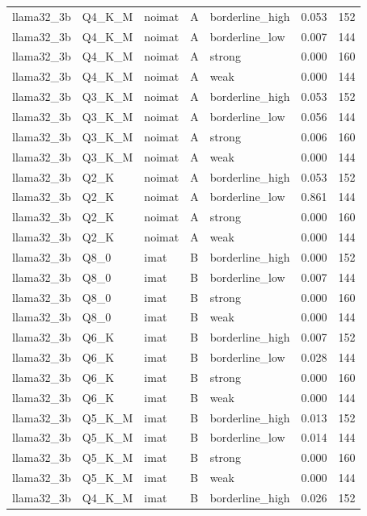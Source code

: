 \begin{tabular}{lllllrr}
llama32\_3b & Q4\_K\_M & noimat & A & borderline\_high & 0.053 & 152 \\
llama32\_3b & Q4\_K\_M & noimat & A & borderline\_low & 0.007 & 144 \\
llama32\_3b & Q4\_K\_M & noimat & A & strong & 0.000 & 160 \\
llama32\_3b & Q4\_K\_M & noimat & A & weak & 0.000 & 144 \\
llama32\_3b & Q3\_K\_M & noimat & A & borderline\_high & 0.053 & 152 \\
llama32\_3b & Q3\_K\_M & noimat & A & borderline\_low & 0.056 & 144 \\
llama32\_3b & Q3\_K\_M & noimat & A & strong & 0.006 & 160 \\
llama32\_3b & Q3\_K\_M & noimat & A & weak & 0.000 & 144 \\
llama32\_3b & Q2\_K & noimat & A & borderline\_high & 0.053 & 152 \\
llama32\_3b & Q2\_K & noimat & A & borderline\_low & 0.861 & 144 \\
llama32\_3b & Q2\_K & noimat & A & strong & 0.000 & 160 \\
llama32\_3b & Q2\_K & noimat & A & weak & 0.000 & 144 \\
llama32\_3b & Q8\_0 & imat & B & borderline\_high & 0.000 & 152 \\
llama32\_3b & Q8\_0 & imat & B & borderline\_low & 0.007 & 144 \\
llama32\_3b & Q8\_0 & imat & B & strong & 0.000 & 160 \\
llama32\_3b & Q8\_0 & imat & B & weak & 0.000 & 144 \\
llama32\_3b & Q6\_K & imat & B & borderline\_high & 0.007 & 152 \\
llama32\_3b & Q6\_K & imat & B & borderline\_low & 0.028 & 144 \\
llama32\_3b & Q6\_K & imat & B & strong & 0.000 & 160 \\
llama32\_3b & Q6\_K & imat & B & weak & 0.000 & 144 \\
llama32\_3b & Q5\_K\_M & imat & B & borderline\_high & 0.013 & 152 \\
llama32\_3b & Q5\_K\_M & imat & B & borderline\_low & 0.014 & 144 \\
llama32\_3b & Q5\_K\_M & imat & B & strong & 0.000 & 160 \\
llama32\_3b & Q5\_K\_M & imat & B & weak & 0.000 & 144 \\
llama32\_3b & Q4\_K\_M & imat & B & borderline\_high & 0.026 & 152 \\

\end{tabular}
